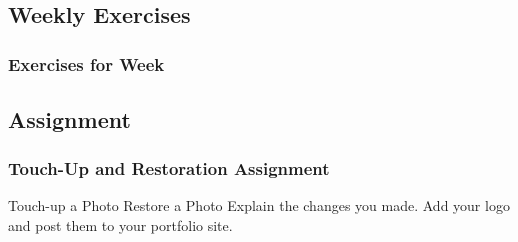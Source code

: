 \documentclass{beamer}
\begin{document}
			\subsection{}		
				\begin{frame}
					\frametitle{}
					\begin{outline}
						\1 
						\1 
						\1 
						\1 
					\end{outline}
				\end{frame}

	\section{}
			\subsection{}		
				\begin{frame}
					\frametitle{}
						\begin{outline}
							\1 
							\1 
							\1 
						\end{outline}
				\end{frame}
		
		\section{}
		
				\subsection{Weekly Exercises}		
	\begin{frame}
		\frametitle{Exercises for Week }
		\begin{outline}
			\1 
			\1 
			\1 
			\1 
			\1 
			\1 
		\end{outline}
	\end{frame}


	\subsection{Assignment}		
	\begin{frame}
		\frametitle{Touch-Up and Restoration Assignment}
		\begin{outline}
			\1 Touch-up a Photo
			\1 Restore a Photo
			\1 Explain the changes you made.
			\1 Add your logo and post them to your portfolio site.
		\end{outline}
	\end{frame}
	
			
\end{document}

